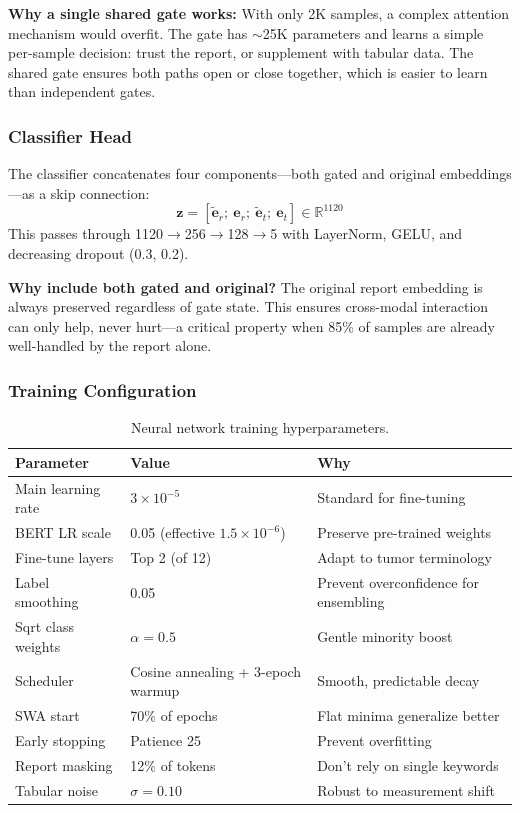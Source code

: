 \textbf{Why a single shared gate works:} With only 2K samples, a complex attention mechanism would overfit. The gate has $\sim$25K parameters and learns a simple per-sample decision: trust the report, or supplement with tabular data. The shared gate ensures both paths open or close together, which is easier to learn than independent gates.

\subsubsection{Classifier Head}

The classifier concatenates four components---both gated and original embeddings---as a skip connection:
\begin{equation}
\mathbf{z} = [\tilde{\mathbf{e}}_r;\ \mathbf{e}_r;\ \tilde{\mathbf{e}}_t;\ \mathbf{e}_t] \in \mathbb{R}^{1120}
\end{equation}
This passes through 1120$\to$256$\to$128$\to$5 with LayerNorm, GELU, and decreasing dropout (0.3, 0.2).

\textbf{Why include both gated and original?} The original report embedding is always preserved regardless of gate state. This ensures cross-modal interaction can only help, never hurt---a critical property when 85\% of samples are already well-handled by the report alone.

\subsubsection{Training Configuration}

\begin{table}[H]
\centering
\caption{Neural network training hyperparameters.}
\label{tab:nn_params}
\begin{tabular}{lll}
\toprule
\textbf{Parameter} & \textbf{Value} & \textbf{Why} \\
\midrule
Main learning rate & $3 \times 10^{-5}$ & Standard for fine-tuning \\
BERT LR scale & 0.05 (effective $1.5 \times 10^{-6}$) & Preserve pre-trained weights \\
Fine-tune layers & Top 2 (of 12) & Adapt to tumor terminology \\
Label smoothing & 0.05 & Prevent overconfidence for ensembling \\
Sqrt class weights & $\alpha = 0.5$ & Gentle minority boost \\
Scheduler & Cosine annealing + 3-epoch warmup & Smooth, predictable decay \\
SWA start & 70\% of epochs & Flat minima generalize better \\
Early stopping & Patience 25 & Prevent overfitting \\
Report masking & 12\% of tokens & Don't rely on single keywords \\
Tabular noise & $\sigma = 0.10$ & Robust to measurement shift \\
\bottomrule
\end{tabular}
\end{table}

